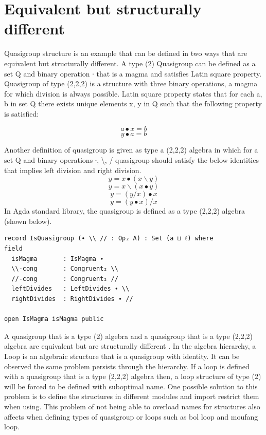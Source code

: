 \section{Equivalent but structurally different}
Quasigroup structure is an example that can be defined in two ways that are
equivalent but structurally different. A type (2) Quasigroup can be defined as a
set Q and binary operation ∙ that is a magma and satisfies Latin square
property. Quasigroup of type (2,2,2) is a structure with three binary
operations, a magma for which division is always possible. Latin square property
states that for each a, b in set Q there exists unique elements x, y in Q such
that the following property is satisfied:
\cite{quasigroupWiki}
\begin{center}
\[a ∙ x = b\]
\[y ∙ a = b\]
\end{center}
Another definition of quasigroup is given as type a (2,2,2) algebra in which for a
set Q and binary operations ∙, \textbackslash{}, / quasigroup should satisfy
the below identities that implies left division and right division. 
\[y = x ∙ (x \backslash y)\]
\[y = x \backslash (x ∙ y)\]
\[y = (y / x) ∙ x\]
\[y = (y ∙ x) / x\] 
In Agda standard library, the quasigroup is defined as a
type (2,2,2) algebra (shown below).

\begin{verbatim}
record IsQuasigroup (∙ \\ // : Op₂ A) : Set (a ⊔ ℓ) where
field
  isMagma       : IsMagma ∙
  \\-cong       : Congruent₂ \\
  //-cong       : Congruent₂ //
  leftDivides   : LeftDivides ∙ \\
  rightDivides  : RightDivides ∙ //

open IsMagma isMagma public
\end{verbatim}

A quasigroup that is a type (2) algebra and a quasigroup that is a type (2,2,2)
algebra are equivalent but are structurally different \cite{flinn2021algebraic}. In the
algebra hierarchy, a Loop is an algebraic structure that is a quasigroup with
identity. It can be observed the same problem persists through the hierarchy. If
a loop is defined with a quasigroup that is a type (2,2,2) algebra then, a
loop structure of type (2) will be forced to be defined with suboptimal name.
One possible solution to this problem is to define the structures in different
modules and import restrict them when using. This problem of not being able to
overload names for structures also affects when defining types of quasigroup or
loops such as bol loop and moufang loop.

